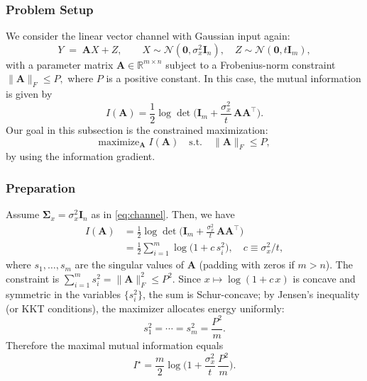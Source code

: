 \documentclass[conference]{IEEEtran}
\begin{document}
\subsubsection{Problem Setup}
We consider the linear vector channel with Gaussian input again:
\begin{equation}
\label{eq:channel}
Y \;=\; \bm A X +  Z, \qquad
X \sim \mathcal N(\bm 0, \sigma_x^2 \bm I_n),\quad
Z \sim \mathcal N(\bm 0, t \bm I_m),
\end{equation}
with a parameter matrix $\bm A \in \mathbb R^{m\times n}$ subject to a Frobenius-norm constraint
$
\|\bm A\|_F \le P,
$
where $P$ is a positive constant.
In this case, the mutual information is given by
\begin{equation}
\label{eq:I-logdet}
I(\bm A) = \frac{1}{2}\log\det\!\Big(\bm I_m + \frac{\sigma_x^2}{t}\,\bm A\bm A^\top\Big).
\end{equation}
Our goal in this subsection is the constrained maximization:
\begin{equation}
\label{eq:opt-A}
\text{maximize}_{\bm A}\; I(\bm A)\quad \text{s.t.}\quad \|\bm A\|_F\le P,
\end{equation}
by using the information gradient.

\subsubsection{Preparation}
Assume $\bm\Sigma_x=\sigma_x^2\bm I_n$ as in \eqref{eq:channel}. 
Then, we have
\begin{align}
I(\bm A)
&=\frac12\log\det\!\Big(\bm I_m+\frac{\sigma_x^2}{t}\,\bm A\bm A^\top\Big) \\
&=\frac12\sum_{i=1}^{m}\log\!\big(1+c\,s_i^2\big),\quad c\equiv\sigma_x^2/t,
\end{align}
where $s_1,\dots,s_m$ are the singular values of $\bm A$ (padding with zeros if $m>n$). The constraint is
$\sum_{i=1}^m s_i^2=\|\bm A\|_F^2\le P^2$.
Since $x\mapsto \log(1+c\,x)$ is concave and symmetric 
in the variables $\{s_i^2\}$, the sum is Schur-concave; by Jensen's inequality 
(or KKT conditions), the maximizer allocates energy uniformly:
\[
s_1^2=\cdots=s_m^2=\frac{P^2}{m}.
\]
Therefore the maximal mutual information equals
\begin{equation}
\label{eq:theory-optimum}
I^\star
=\frac{m}{2}\log\!\Big(1+\frac{\sigma_x^2}{t}\,\frac{P^2}{m}\Big).
\end{equation}
\end{document}
